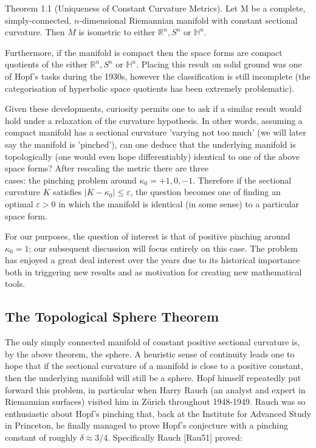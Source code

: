\documentclass[10pt, letterpaper]{article}
\begin{document}
Theorem 1.1 (Uniqueness of Constant Curvature Metrics). Let M be a complete, simply-connected, $n$-dimensional Riemannian manifold with constant sectional curvature. Then $M$ is isometric to either $\mathbb{R}^{n}, S^{n}$ or $\mathbb{H}^{n}$.

Furthermore, if the manifold is compact then the space forms are compact quotients of the either $\mathbb{R}^{n}, S^{n}$ or $\mathbb{H}^{n}$. Placing this result on solid ground was one of Hopf's tasks during the 1930s, however the classification is still incomplete (the categorisation of hyperbolic space quotients has been extremely problematic).

Given these developments, curiosity permits one to ask if a similar result would hold under a relaxation of the curvature hypothesis. In other words, assuming a compact manifold has a sectional curvature 'varying not too much' (we will later say the manifold is 'pinched'), can one deduce that the underlying manifold is topologically (one would even hope differentiably) identical to one of the above space forms? After rescaling the metric there are three\\
cases: the pinching problem around $\kappa_{0}=+1,0,-1$. Therefore if the sectional curvature $K$ satisfies $\left|K-\kappa_{0}\right| \leq \varepsilon$, the question becomes one of finding an optimal $\varepsilon>0$ in which the manifold is identical (in some sense) to a particular space form.

For our purposes, the question of interest is that of positive pinching around $\kappa_{0}=1$; our subsequent discussion will focus entirely on this case. The problem has enjoyed a great deal interest over the years due to its historical importance both in triggering new results and as motivation for creating new mathematical tools.

\subsection*{The Topological Sphere Theorem}
The only simply connected manifold of constant positive sectional curvature is, by the above theorem, the sphere. A heuristic sense of continuity leads one to hope that if the sectional curvature of a manifold is close to a positive constant, then the underlying manifold will still be a sphere. Hopf himself repeatedly put forward this problem, in particular when Harry Rauch (an analyst and expert in Riemannian surfaces) visited him in Zürich throughout 1948-1949. Rauch was so enthusiastic about Hopf's pinching that, back at the Institute for Advanced Study in Princeton, he finally managed to prove Hopf's conjecture with a pinching constant of roughly $\delta \approx 3 / 4$. Specifically Rauch [Rau51] proved:
\end{document}
